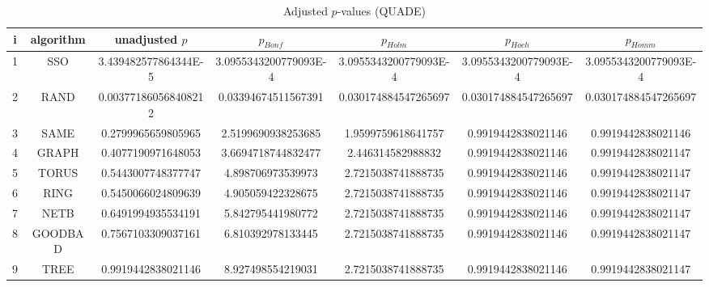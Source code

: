 \documentclass[a4paper,10pt]{article}
\begin{document}
\begin{landscape}
\begin{table}[!htp]
\centering\scriptsize
\caption{Adjusted $p$-values (QUADE)}
\begin{tabular}{ccccccc}
i&algorithm&unadjusted $p$&$p_{Bonf}$&$p_{Holm}$&$p_{Hoch}$&$p_{Homm}$\\
\hline
1& SSO&3.439482577864344E-5&3.0955343200779093E-4&3.0955343200779093E-4&3.0955343200779093E-4&3.0955343200779093E-4\\
2& RAND&0.003771860568408212&0.03394674511567391&0.030174884547265697&0.030174884547265697&0.030174884547265697\\
3& SAME&0.2799965659805965&2.5199690938253685&1.9599759618641757&0.9919442838021146&0.9919442838021146\\
4& GRAPH&0.4077190971648053&3.6694718744832477&2.446314582988832&0.9919442838021146&0.9919442838021147\\
5& TORUS&0.5443007748377747&4.898706973539973&2.7215038741888735&0.9919442838021146&0.9919442838021147\\
6& RING&0.5450066024809639&4.905059422328675&2.7215038741888735&0.9919442838021146&0.9919442838021147\\
7& NETB&0.6491994935534191&5.842795441980772&2.7215038741888735&0.9919442838021146&0.9919442838021147\\
8& GOODBAD&0.7567103309037161&6.810392978133445&2.7215038741888735&0.9919442838021146&0.9919442838021147\\
9& TREE&0.9919442838021146&8.927498554219031&2.7215038741888735&0.9919442838021146&0.9919442838021147\\
\hline
\end{tabular}
\end{table}


\end{landscape}
\end{document}
